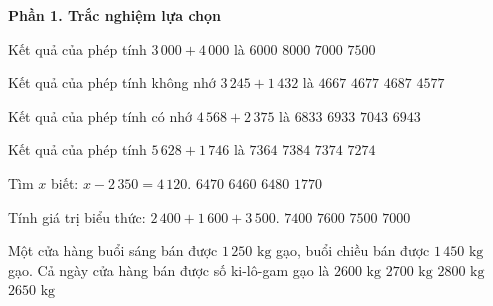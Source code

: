 \textbf{Phần 1. Trắc nghiệm lựa chọn}

\begin{ex} %
Kết quả của phép tính $3\,000 + 4\,000$ là
\choice
{$6000$}
{$8000$}
{\True $7000$}
{$7500$}
\end{ex}

\begin{ex} %
Kết quả của phép tính không nhớ $3\,245 + 1\,432$ là
\choice
{$4667$}
{\True $4677$}
{$4687$}
{$4577$}
\end{ex}

\begin{ex} %
Kết quả của phép tính có nhớ $4\,568 + 2\,375$ là
\choice
{$6833$}
{$6933$}
{$7043$}
{\True $6943$}
\end{ex}

\begin{ex} %
Kết quả của phép tính $5\,628 + 1\,746$ là
\choice
{$7364$}
{$7384$}
{\True $7374$}
{$7274$}
\end{ex}

\begin{ex} %
Tìm $x$ biết: $x - 2\,350 = 4\,120$.
\choice
{\True $6470$}
{$6460$}
{$6480$}
{$1770$}
\end{ex}

\begin{ex} %
Tính giá trị biểu thức: $2\,400 + 1\,600 + 3\,500$.
\choice
{$7400$}
{$7600$}
{\True $7500$}
{$7000$}
\end{ex}

\begin{ex} %
Một cửa hàng buổi sáng bán được $1\,250\text{ kg}$ gạo, buổi chiều bán được $1\,450\text{ kg}$ gạo. Cả ngày cửa hàng bán được số ki-lô-gam gạo là
\choice
{$2600\text{ kg}$}
{\True $2700\text{ kg}$}
{$2800\text{ kg}$}
{$2650\text{ kg}$}
\end{ex}

